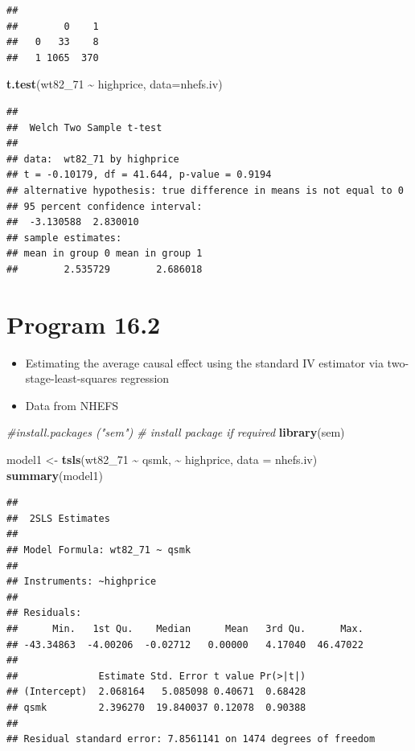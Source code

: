 \documentclass[
  10pt,
]{book}
\newenvironment{Shaded}{\begin{snugshade}}{\end{snugshade}}
\newcommand{\CommentTok}[1]{\textcolor[rgb]{0.56,0.35,0.01}{\textit{#1}}}
\newcommand{\DataTypeTok}[1]{\textcolor[rgb]{0.13,0.29,0.53}{#1}}
\newcommand{\DecValTok}[1]{\textcolor[rgb]{0.00,0.00,0.81}{#1}}
\newcommand{\KeywordTok}[1]{\textcolor[rgb]{0.13,0.29,0.53}{\textbf{#1}}}
\newcommand{\NormalTok}[1]{#1}
\newcommand{\OperatorTok}[1]{\textcolor[rgb]{0.81,0.36,0.00}{\textbf{#1}}}
\newcommand{\StringTok}[1]{\textcolor[rgb]{0.31,0.60,0.02}{#1}}
\providecommand{\tightlist}{%
  \setlength{\itemsep}{0pt}\setlength{\parskip}{0pt}}
\begin{document}
\begin{verbatim}
##    
##        0    1
##   0   33    8
##   1 1065  370
\end{verbatim}

\begin{Shaded}
\begin{Highlighting}[]
\KeywordTok{t.test}\NormalTok{(wt82\_}\DecValTok{71} \OperatorTok{\textasciitilde{}}\StringTok{ }\NormalTok{highprice, }\DataTypeTok{data=}\NormalTok{nhefs.iv)}
\end{Highlighting}
\end{Shaded}

\begin{verbatim}
## 
##  Welch Two Sample t-test
## 
## data:  wt82_71 by highprice
## t = -0.10179, df = 41.644, p-value = 0.9194
## alternative hypothesis: true difference in means is not equal to 0
## 95 percent confidence interval:
##  -3.130588  2.830010
## sample estimates:
## mean in group 0 mean in group 1 
##        2.535729        2.686018
\end{verbatim}

\hypertarget{program-16.2}{%
\section{Program 16.2}\label{program-16.2}}

\begin{itemize}
\tightlist
\item
  Estimating the average causal effect using the standard IV estimator via two-stage-least-squares regression
\item
  Data from NHEFS
\end{itemize}

\begin{Shaded}
\begin{Highlighting}[]
\CommentTok{\#install.packages ("sem") \# install package if required}
\KeywordTok{library}\NormalTok{(sem) }

\NormalTok{model1 \textless{}{-}}\StringTok{ }\KeywordTok{tsls}\NormalTok{(wt82\_}\DecValTok{71} \OperatorTok{\textasciitilde{}}\StringTok{ }\NormalTok{qsmk, }\OperatorTok{\textasciitilde{}}\StringTok{ }\NormalTok{highprice, }\DataTypeTok{data =}\NormalTok{ nhefs.iv)}
\KeywordTok{summary}\NormalTok{(model1)}
\end{Highlighting}
\end{Shaded}

\begin{verbatim}
## 
##  2SLS Estimates
## 
## Model Formula: wt82_71 ~ qsmk
## 
## Instruments: ~highprice
## 
## Residuals:
##      Min.   1st Qu.    Median      Mean   3rd Qu.      Max. 
## -43.34863  -4.00206  -0.02712   0.00000   4.17040  46.47022 
## 
##              Estimate Std. Error t value Pr(>|t|)
## (Intercept)  2.068164   5.085098 0.40671  0.68428
## qsmk         2.396270  19.840037 0.12078  0.90388
## 
## Residual standard error: 7.8561141 on 1474 degrees of freedom
\end{verbatim}
\end{document}
